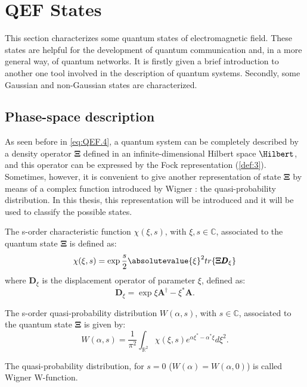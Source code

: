 \section{QEF States}
    This section characterizes some quantum states of electromagnetic field. These states are
    helpful for the development of quantum communication and, in a more general way, of quantum
    networks. It is firstly given a brief introduction to another one tool involved in the 
    description of quantum systems. Secondly, some Gaussian and non-Gaussian states 
    are characterized.

    \subsection{Phase-space description}
        As seen before in \ref{eq:QEF.4}, a quantum system can be completely
        described by a density operator $\pmb{\Xi}$ defined in an infinite-dimensional Hilbert space
        $\Hilbert$, and this operator can be expressed by the Fock representation (\ref{def:3}).
        Sometimes, however, it is convenient to give another representation of state $\pmb{\Xi}$ by
        means of a complex function introduced by Wigner \cite{Wigner}: the quasi-probability 
        distribution. In this thesis, this representation will be introduced and it will be used to
        classify the possible states.

        \begin{definition}
            The s-order characteristic function $\mathcal{\chi}(\xi,s)$, with $\xi,s\in\mathbb{C}$,
            associated to the quantum state $\pmb{\Xi}$ is defined as:
            \begin{equation}
                \mathcal{\chi}(\xi,s)=\exp{\frac{s}{2}\absolutevalue{\xi}^2}
                tr\{\pmb{\Xi}\pmb{D}_\xi\}
            \end{equation}
            where $\pmb{D}_\xi$ is  the displacement operator of parameter $\xi$, defined as:
            \begin{equation}
                \pmb{D}_\xi=\exp{\xi\pmb{A}^\dagger-\xi^*\pmb{A}}.
            \end{equation}
        \end{definition}
        \begin{definition}
            The s-order quasi-probability distribution $W(\alpha,s)$, with $s\in\mathbb{C}$,
            associated to the quantum state $\mathbf{\Xi}$ is given by:
            \begin{equation*}
                W(\alpha,s)=\frac{1}{\pi^2}\int_{\mathbb{R}^2} 
                \mathcal{\chi}(\xi,s)e^{\alpha\xi^*-\alpha^*\xi}d\xi^2.
            \end{equation*}

        \end{definition}
        The quasi-probability distribution, for $s=0$ ($W(\alpha)=W(\alpha,0)$) is called 
        Wigner W-function.
        
